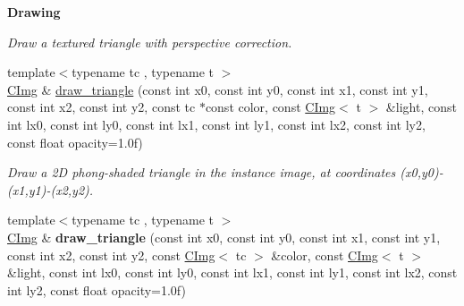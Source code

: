 \begin{Indent}{\bf Drawing}
\begin{DoxyCompactItemize}
\begin{DoxyCompactList}\small\item\em Draw a textured triangle with perspective correction. \end{DoxyCompactList}\item 
{\footnotesize template$<$typename tc , typename t $>$ }\\\hyperlink{structcimg__library_1_1_c_img}{C\-Img} \& \hyperlink{structcimg__library_1_1_c_img_ad072f30cd1f3ae2775f52c0d28310a27}{draw\-\_\-triangle} (const int x0, const int y0, const int x1, const int y1, const int x2, const int y2, const tc $\ast$const color, const \hyperlink{structcimg__library_1_1_c_img}{C\-Img}$<$ t $>$ \&light, const int lx0, const int ly0, const int lx1, const int ly1, const int lx2, const int ly2, const float opacity=1.\-0f)
\begin{DoxyCompactList}\small\item\em Draw a 2\-D phong-\/shaded triangle in the instance image, at coordinates ({\ttfamily x0},{\ttfamily y0})-\/({\ttfamily x1},{\ttfamily y1})-\/({\ttfamily x2},{\ttfamily y2}). \end{DoxyCompactList}\item 
\hypertarget{structcimg__library_1_1_c_img_a87b6a34cc2d50a12e8d67c00cf0c925a}{{\footnotesize template$<$typename tc , typename t $>$ }\\\hyperlink{structcimg__library_1_1_c_img}{C\-Img} \& {\bfseries draw\-\_\-triangle} (const int x0, const int y0, const int x1, const int y1, const int x2, const int y2, const \hyperlink{structcimg__library_1_1_c_img}{C\-Img}$<$ tc $>$ \&color, const \hyperlink{structcimg__library_1_1_c_img}{C\-Img}$<$ t $>$ \&light, const int lx0, const int ly0, const int lx1, const int ly1, const int lx2, const int ly2, const float opacity=1.\-0f)}\label{structcimg__library_1_1_c_img_a87b6a34cc2d50a12e8d67c00cf0c925a}


\end{DoxyCompactItemize}
\end{Indent}
